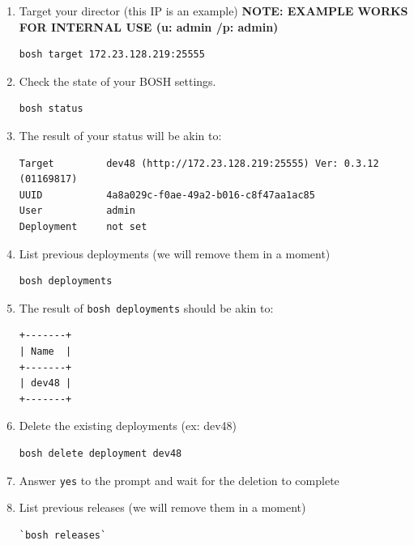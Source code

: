 \begin{enumerate}
\item Target your director (this IP is an example) \textbf{NOTE: EXAMPLE WORKS FOR INTERNAL USE (u: admin \slash  p: admin)}

\begin{verbatim}
bosh target 172.23.128.219:25555 
\end{verbatim}


\item Check the state of your BOSH settings.

\begin{verbatim}
bosh status
\end{verbatim}


\item The result of your status will be akin to:

\begin{verbatim}
Target         dev48 (http://172.23.128.219:25555) Ver: 0.3.12 (01169817)
UUID           4a8a029c-f0ae-49a2-b016-c8f47aa1ac85
User           admin
Deployment     not set
\end{verbatim}


\item List previous deployments (we will remove them in a moment)

\begin{verbatim}
bosh deployments
\end{verbatim}


\item The result of \texttt{bosh deployments} should be akin to:

\begin{verbatim}
+-------+
| Name  |
+-------+
| dev48 |
+-------+
\end{verbatim}


\item Delete the existing deployments (ex: dev48) 

\begin{verbatim}
bosh delete deployment dev48
\end{verbatim}


\item Answer \texttt{yes} to the prompt and wait for the deletion to complete

\item List previous releases (we will remove them in a moment)

\begin{verbatim}
`bosh releases`
\end{verbatim}



\end{enumerate}
